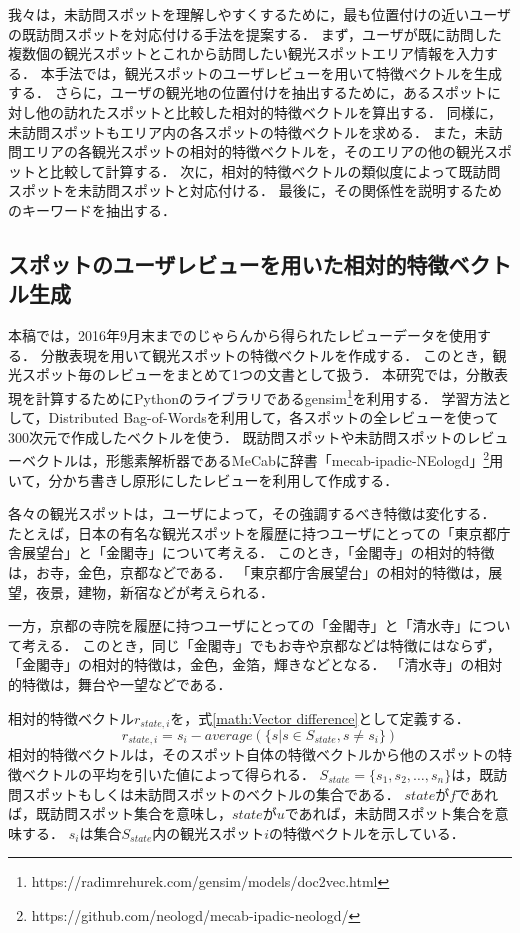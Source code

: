 \documentclass[submit]{ipsj}
\begin{document}
我々は，未訪問スポットを理解しやすくするために，最も位置付けの近いユーザの既訪問スポットを対応付ける手法を提案する．
まず，ユーザが既に訪問した複数個の観光スポットとこれから訪問したい観光スポットエリア情報を入力する．
本手法では，観光スポットのユーザレビューを用いて特徴ベクトルを生成する．
さらに，ユーザの観光地の位置付けを抽出するために，あるスポットに対し他の訪れたスポットと比較した相対的特徴ベクトルを算出する．
同様に，未訪問スポットもエリア内の各スポットの特徴ベクトルを求める．
また，未訪問エリアの各観光スポットの相対的特徴ベクトルを，そのエリアの他の観光スポットと比較して計算する．
次に，相対的特徴ベクトルの類似度によって既訪問スポットを未訪問スポットと対応付ける．
最後に，その関係性を説明するためのキーワードを抽出する．

\subsection{スポットのユーザレビューを用いた相対的特徴ベクトル生成}
\label{subsec:スポットのレビューから相対的特徴ベクトル生成}
本稿では，2016年9月末までのじゃらんから得られたレビューデータを使用する．
分散表現\cite{Le}を用いて観光スポットの特徴ベクトルを作成する．
このとき，観光スポット毎のレビューをまとめて1つの文書として扱う．
本研究では，分散表現を計算するためにPythonのライブラリであるgensim\footnote{https://radimrehurek.com/gensim/models/doc2vec.html}を利用する．
学習方法として，Distributed Bag-of-Wordsを利用して，各スポットの全レビューを使って300次元で作成したベクトルを使う．
既訪問スポットや未訪問スポットのレビューベクトルは，形態素解析器であるMeCab\cite{Kudo}に辞書「mecab-ipadic-NEologd」\footnote{https://github.com/neologd/mecab-ipadic-neologd/}用いて，分かち書きし原形にしたレビューを利用して作成する．

各々の観光スポットは，ユーザによって，その強調するべき特徴は変化する．
たとえば，日本の有名な観光スポットを履歴に持つユーザにとっての「東京都庁舎展望台」と「金閣寺」について考える．
このとき，「金閣寺」の相対的特徴は，お寺，金色，京都などである．
「東京都庁舎展望台」の相対的特徴は，展望，夜景，建物，新宿などが考えられる．

一方，京都の寺院を履歴に持つユーザにとっての「金閣寺」と「清水寺」について考える．
このとき，同じ「金閣寺」でもお寺や京都などは特徴にはならず，「金閣寺」の相対的特徴は，金色，金箔，輝きなどとなる．
「清水寺」の相対的特徴は，舞台や一望などである．

相対的特徴ベクトル$r_{state,i}$を，式\ref{math:Vector difference}として定義する．
\begin{equation}
  r_{state,i}=s_i-average(\{	s|s \in S_{state},s \neq s_i \})
  \label{math:Vector difference}
\end{equation}
相対的特徴ベクトルは，そのスポット自体の特徴ベクトルから他のスポットの特徴ベクトルの平均を引いた値によって得られる．
$S_{state} =\{s_1,s_2,\dots,s_n\}$は，既訪問スポットもしくは未訪問スポットのベクトルの集合である．
$state$が$f$であれば，既訪問スポット集合を意味し，$state$が$u$であれば，未訪問スポット集合を意味する．
$s_i$は集合$S_{state}$内の観光スポット$i$の特徴ベクトルを示している．
\end{document}

